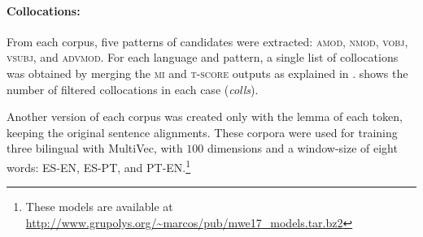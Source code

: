 \documentclass[output=paper,modfonts,nonflat]{langsci/langscibook}
\begin{document}
\begin{table} 
        \caption{\label{tab:mono} Number of unique input dependencies for each syntactic pattern (\emph{deps}),
          and final monolingual collocation candidates (\emph{colls}).}
\end{table}

\paragraph*{Collocations:} From each corpus, five patterns of  candidates
were extracted: \textsc{amod}, \textsc{nmod}, \textsc{vobj}, \textsc{vsubj}, and \textsc{advmod}.
For each language and pattern, a single list of collocations was obtained by merging the \textsc{mi}
and \textsc{t-score} outputs as explained in . 
shows the number of filtered collocations in each case (\emph{colls}).

Another version of each corpus was created only with the lemma of each token,
keeping the original sentence alignments. These corpora were used for training
three bilingual  with MultiVec, with $100$ dimensions and
a window-size of eight words: ES-EN, ES-PT, and PT-EN.\footnote{These models are available at \scriptsize{\url{http://www.grupolys.org/~marcos/pub/mwe17_models.tar.bz2}}}
\end{document}
